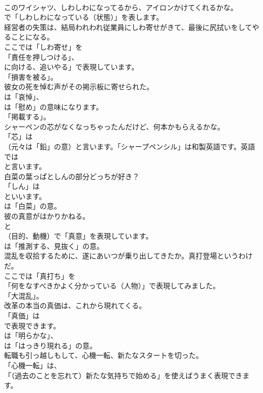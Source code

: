 \documentclass[8pt]{extreport}
\begin{document}
\begin{CJK}{UTF8}{min}
\\	このワイシャツ、しわしわになってるから、アイロンかけてくれるかな。 
\\	で「しわしわになっている（状態）」を表します。	
\\	経営者の失策は、結局われわれ従業員にしわ寄せがきて、最後に尻拭いをしてやることになる。 
\\	ここでは「しわ寄せ」を
\\	「責任を押しつける」、
\\	に向ける、追いやる」で表現しています。
\\	「損害を被る」。	
\\	彼女の死を悼む声がその掲示板に寄せられた。 
\\	は「哀悼」、
\\	は「慰め」の意味になります。
\\	「掲載する」。	
\\	シャーペンの芯がなくなっちゃったんだけど、何本かもらえるかな。 
\\	「芯」は
\\	（元々は「鉛」の意）と言います。「シャープペンシル」は和製英語です。英語では
\\	と言います。	
\\	白菜の葉っぱとしんの部分どっちが好き？ 
\\	「しん」は 
\\	といいます。
\\	は「白菜」の意。	
\\	彼の真意がはかりかねる。 
\\	と 
\\	（目的、動機）で「真意」を表現しています。
\\	は「推測する、見抜く」の意。	
\\	混乱を収拾するために、遂にあいつが乗り出してきたか。真打登場というわけだ。 
\\	ここでは「真打ち」を
\\	「何をなすべきかよく分かっている（人物）」で表現してみました。
\\	「大混乱」。	
\\	改革の本当の真価は、これから現れてくる。 
\\	「真価」は 
\\	で表現できます。
\\	は「明らかな」、
\\	は「はっきり現れる」の意。	
\\	転職も引っ越しもして、心機一転、新たなスタートを切った。 
\\	「心機一転」は、
\\	「（過去のことを忘れて）新たな気持ちで始める」を使えばうまく表現できます。	

\end{CJK}
\end{document}
